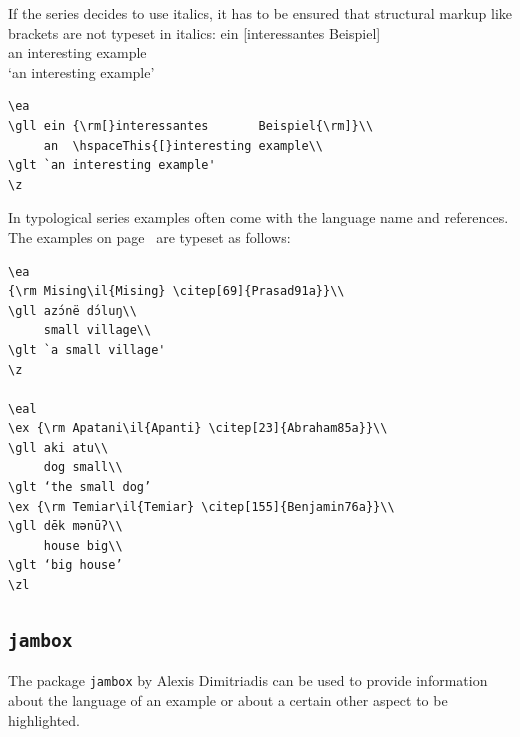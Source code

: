 If the series decides to use italics, it has to be ensured that structural markup like brackets are
not typeset in italics:
\ea
\def\exfont{\normalsize\it}
\gll ein {\rm[}interessantes       Beispiel{\rm]}\\
     an  \hspaceThis{[}interesting example\\
\glt `an interesting example'
\z 
\begin{verbatim}
\ea
\gll ein {\rm[}interessantes       Beispiel{\rm]}\\
     an  \hspaceThis{[}interesting example\\
\glt `an interesting example'
\z 
\end{verbatim}

In typological series examples often come with the language name and references. The examples on
page~\pageref{ex-typology} are typeset as follows:
\begin{verbatim}
\ea
{\rm Mising\il{Mising} \citep[69]{Prasad91a}}\\
\gll azɔ́në dɔ́luŋ\\
     small village\\ 
\glt `a small village' 
\z

\eal
\ex {\rm Apatani\il{Apanti} \citep[23]{Abraham85a}}\\
\gll aki atu\\ 
     dog small\\ 
\glt ‘the small dog’ 
\ex {\rm Temiar\il{Temiar} \citep[155]{Benjamin76a}}\\ 
\gll dēk mənūʔ\\
     house big\\
\glt ‘big house’ 
\zl
\end{verbatim}


\subsection{\texttt{jam\-box}}
\label{sec-jambox}


The package \texttt{jambox} by Alexis Dimitriadis can be used to provide information about the language of an example or
about a certain other aspect to be highlighted.
\settowidth{}
\eal
{}
\zl

